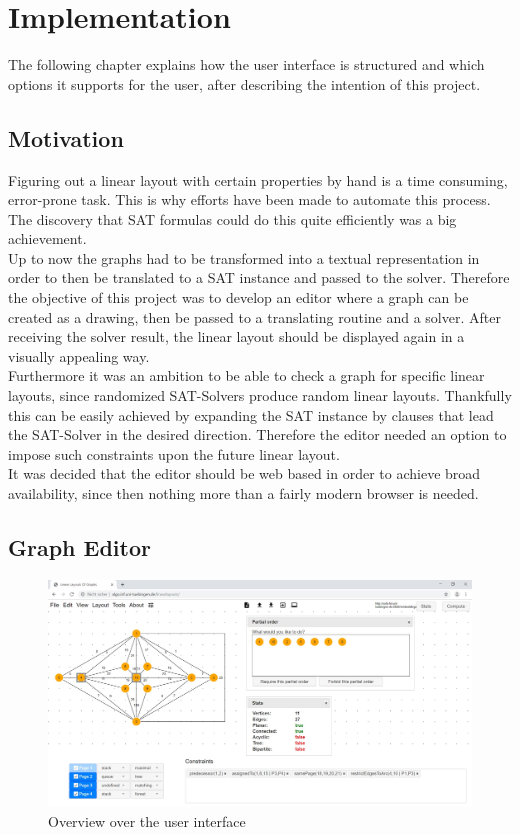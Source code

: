 
\chapter{Implementation}
  \label{Implementation}
The following chapter explains how the user interface is structured and which options it supports for the user, after describing the intention of this project.
\section{Motivation}
Figuring out a linear layout with certain properties by hand is a time consuming, error-prone task. This is why efforts have been made to automate this process. The discovery that SAT formulas could do this quite efficiently \cite{Bekos2015TheBE} was a big achievement.\\
Up to now the graphs had to be transformed into a textual representation in order to then be translated to a SAT instance and passed to the solver. Therefore the objective of this project was to develop an editor where a graph can be created as a drawing, then be passed to a translating routine and a solver. After receiving the solver result, the linear layout should be displayed again in a visually appealing way.\\
Furthermore it was an ambition to be able to check a graph for specific linear layouts, since randomized SAT-Solvers produce random linear layouts. Thankfully this can be easily achieved by expanding the SAT instance by clauses that lead the SAT-Solver in the desired direction. Therefore the editor needed an option to impose such constraints upon the future linear layout.\\
It was decided that the editor should be web based in order to achieve broad availability, since then nothing more than a fairly modern browser is needed.\\
\section{Graph Editor}
\begin{figure}[!h]
\begin{center}
\includegraphics[width=1\textwidth]{figures/figIndex/overviewIndex.jpg}
\caption{Overview over the user interface}
\label{img:overviewIndex}
\end{center}
\end{figure}
